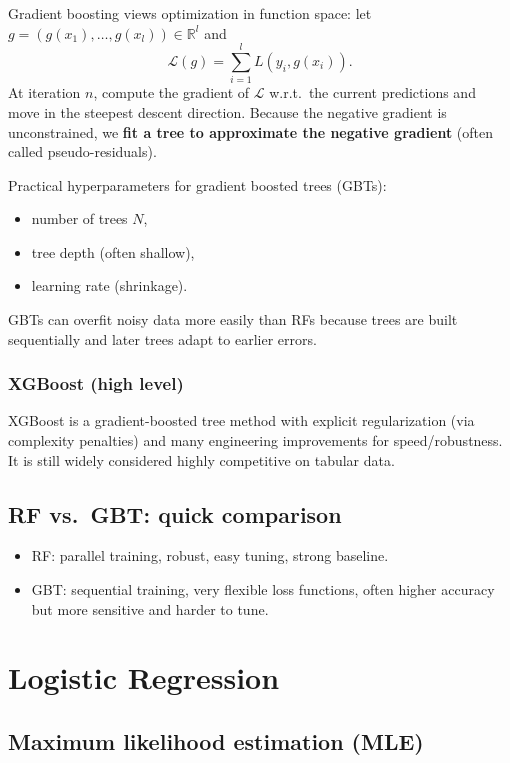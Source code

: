 \documentclass[11pt, oneside]{book}
\newcommand{\R}{\mathbb{R}}
\newcommand{\1}{\ind}                       %
\begin{document}
Gradient boosting views optimization in function space:
let $g=(g(x_1),\dots,g(x_l))\in\R^l$ and
\[
\mathcal{L}(g)=\sum_{i=1}^{l} L(y_i,g(x_i)).
\]
At iteration $n$, compute the gradient of $\mathcal{L}$ w.r.t.\ the current predictions and move in the steepest descent direction.
Because the negative gradient is unconstrained, we \textbf{fit a tree to approximate the negative gradient} (often called pseudo-residuals).

Practical hyperparameters for gradient boosted trees (GBTs):
\begin{itemize}
  \item number of trees $N$,
  \item tree depth (often shallow),
  \item learning rate (shrinkage).
\end{itemize}
GBTs can overfit noisy data more easily than RFs because trees are built sequentially and later trees adapt to earlier errors.

\subsection{XGBoost (high level)}
XGBoost is a gradient-boosted tree method with explicit regularization (via complexity penalties) and many engineering improvements for speed/robustness.
It is still widely considered highly competitive on tabular data.

\section{RF vs.\ GBT: quick comparison}
\begin{itemize}
  \item RF: parallel training, robust, easy tuning, strong baseline.
  \item GBT: sequential training, very flexible loss functions, often higher accuracy but more sensitive and harder to tune.
\end{itemize}


\chapter{Logistic Regression}

\section{Maximum likelihood estimation (MLE)}
\end{document}
